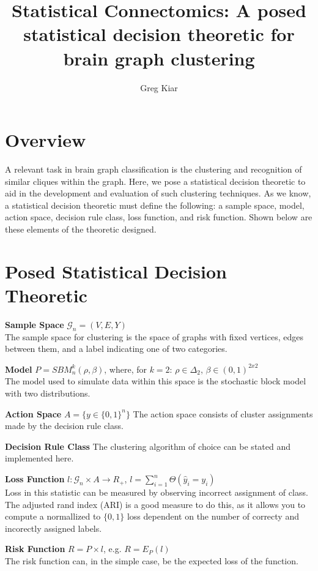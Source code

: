 \documentclass[12pt]{article}
\title{Statistical Connectomics: A posed statistical decision theoretic for brain graph clustering}
\author{Greg Kiar}
\begin{document}
\setlength{\voffset}{-0.5in}
\setlength{\headsep}{5pt}
\maketitle
\vspace{-1cm}
\section*{Overview}
A relevant task in brain graph classification is the clustering and recognition of similar cliques within the graph. Here, we pose a statistical decision theoretic to aid in the development and evaluation of such clustering techniques. As we know, a statistical decision theoretic must define the following: a sample space, model, action space, decision rule class, loss function, and risk function. Shown below are these elements of the theoretic designed.

\section*{Posed Statistical Decision Theoretic} 
\textbf{Sample Space} $\mathcal{G}_n = (V, E, Y)$ \\
The sample space for clustering is the space of graphs with fixed vertices, edges between them, and a label indicating one of two categories.

\textbf{Model} $P = SBM^k_n (\rho, \beta)$, where, for $k=2$: $\rho \in \Delta_2$, $\beta \in (0,1)^{2x2}$\\
The model used to simulate data within this space is the stochastic block model with two distributions.

\textbf{Action Space} $A = \{ y \in \{0, 1\}^n \} $
The action space consists of cluster assignments made by the decision rule class.

\textbf{Decision Rule Class} The clustering algorithm of choice can be stated and implemented here.

\textbf{Loss Function} $l: \mathcal{G}_n \times A \to R_+$, $l = \sum\limits_{i=1}^n \Theta(\hat{y}_i = y_i)$ \\
Loss in this statistic can be measured by observing incorrect assignment of class. The adjusted rand index (ARI) is a good measure to do this, as it allows you to compute a normallized to $\{0,1\}$ loss dependent on the number of correcty and incorectly assigned labels.

\textbf{Risk Function} $R = P \times l$, e.g. $R = E_P(l)$\\
The risk function can, in the simple case, be the expected loss of the function. 
\end{document}
